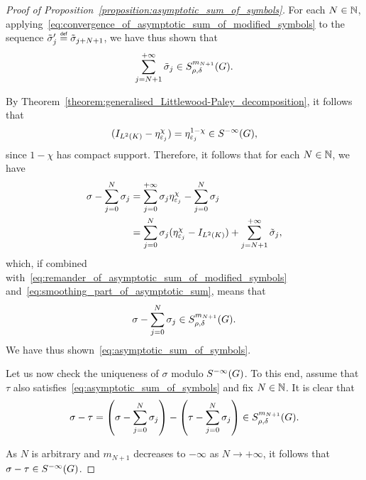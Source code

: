 \begin{proof}[Proof of Proposition~\ref{proposition:asymptotic_sum_of_symbols}]
    For each $N \in \mathbb{N}$,
    applying~\eqref{eq:convergence_of_asymptotic_sum_of_modified_symbols} to the sequence $\tilde \sigma'_j \defeq \tilde \sigma_{j + N + 1}$,
    we have thus shown that
    \begin{align}
        \sum_{j = N + 1}^{+\infty} \tilde \sigma_j
        \in S^{m_{N + 1}}_{\rho, \delta}(G).
        \label{eq:remander_of_asymptotic_sum_of_modified_symbols}
    \end{align}

    By Theorem~\ref{theorem:generalised_Littlewood-Paley_decomposition},
    it follows that
    \begin{align}
        ({I_{{L^{2} (K)}}} - \eta^\chi_{\varepsilon_j})
        = \eta^{1 - \chi}_{\varepsilon_j} \in {S^{-\infty} (G)},
        \label{eq:smoothing_part_of_asymptotic_sum}
    \end{align}
    since $1 - \chi$ has compact support.
    Therefore,
    it follows that for each $N \in \mathbb{N}$,
    we have
    \begin{align*}
        \sigma - \sum_{j = 0}^N \sigma_j
        &= \sum_{j = 0}^{+\infty} \sigma_j \eta^\chi_{\varepsilon_j} - \sum_{j = 0}^N \sigma_j\\
        &= \sum_{j = 0}^N \sigma_j (\eta^{\chi}_{\varepsilon_j} - {I_{{L^{2} (K)}}}) + \sum_{j = N + 1}^{+\infty} \tilde \sigma_j,
    \end{align*}
    which, if combined with~\ref{eq:remander_of_asymptotic_sum_of_modified_symbols}
    and~\ref{eq:smoothing_part_of_asymptotic_sum},
    means that
    \begin{align*}
        \sigma - \sum_{j = 0}^N \sigma_j
        \in S^{m_{N + 1}}_{\rho, \delta}(G).
    \end{align*}
    We have thus shown~\eqref{eq:asymptotic_sum_of_symbols}.

    Let us now check the uniqueness of $\sigma$ modulo ${S^{-\infty} (G)}$.
    To this end,
    assume that $\tau$ also satisfies~\eqref{eq:asymptotic_sum_of_symbols}
    and fix $N \in \mathbb{N}$.
    It is clear that
    \begin{align*}
        \sigma - \tau
        = \left(\sigma - \sum_{j = 0}^N \sigma_j\right) -
        \left(\tau - \sum_{j = 0}^N \sigma_j\right)
        \in S^{m_{N + 1}}_{\rho, \delta}(G).
    \end{align*}

    As $N$ is arbitrary
    and $m_{N + 1}$ decreases to $-\infty$ as $N \to +\infty$,
    it follows that $\sigma - \tau \in {S^{-\infty} (G)}$.
\end{proof}

